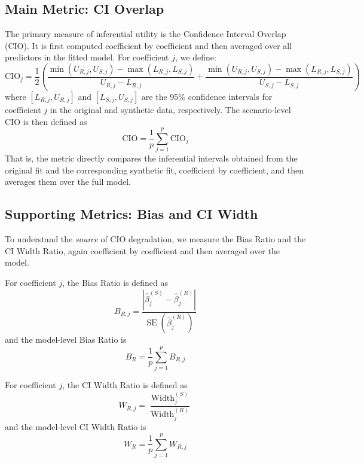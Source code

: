 \subsection{Main Metric: CI Overlap}
The primary measure of inferential utility is the Confidence Interval Overlap (CIO). It is first computed coefficient by coefficient and then averaged over all predictors in the fitted model. For coefficient $j$, we define:
\begin{equation}
    \text{CIO}_j = \frac{1}{2} \left( \frac{\min(U_{R,j}, U_{S,j}) - \max(L_{R,j}, L_{S,j})}{U_{R,j} - L_{R,j}} + \frac{\min(U_{R,j}, U_{S,j}) - \max(L_{R,j}, L_{S,j})}{U_{S,j} - L_{S,j}} \right)
\end{equation}
where $[L_{R,j}, U_{R,j}]$ and $[L_{S,j}, U_{S,j}]$ are the 95\% confidence intervals for coefficient $j$ in the original and synthetic data, respectively. The scenario-level CIO is then defined as
\begin{equation}
    \text{CIO} = \frac{1}{p} \sum_{j=1}^{p} \text{CIO}_j
\end{equation}
That is, the metric directly compares the inferential intervals obtained from the original fit and the corresponding synthetic fit, coefficient by coefficient, and then averages them over the full model.

\subsection{Supporting Metrics: Bias and CI Width}
To understand the \emph{source} of CIO degradation, we measure the Bias Ratio and the CI Width Ratio, again coefficient by coefficient and then averaged over the model.

For coefficient $j$, the Bias Ratio is defined as
\begin{equation}
    B_{R,j} = \frac{|\hat{\beta}^{(S)}_j - \hat{\beta}^{(R)}_j|}{\operatorname{SE}(\hat{\beta}^{(R)}_j)}
\end{equation}
and the model-level Bias Ratio is
\begin{equation}
    B_R = \frac{1}{p} \sum_{j=1}^{p} B_{R,j}
\end{equation}

For coefficient $j$, the CI Width Ratio is defined as
\begin{equation}
    W_{R,j} = \frac{\operatorname{Width}^{(S)}_j}{\operatorname{Width}^{(R)}_j}
\end{equation}
and the model-level CI Width Ratio is
\begin{equation}
    W_R = \frac{1}{p} \sum_{j=1}^{p} W_{R,j}
\end{equation}

